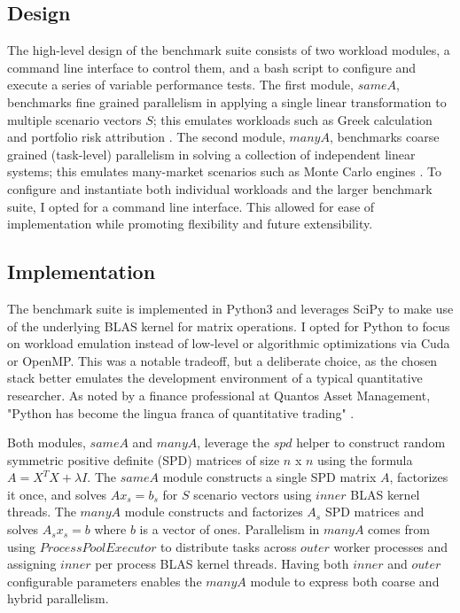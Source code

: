 \documentclass{article}
\begin{document}
\subsection{Design}
The high-level design of the benchmark suite consists of two workload modules, a command line interface to control them, and a bash script to configure and execute a series of variable performance tests. The first module, $sameA$, benchmarks fine grained parallelism in applying a single linear transformation to multiple scenario vectors $S$; this emulates workloads such as Greek calculation and portfolio risk attribution \cite{1}. The second module, $manyA$, benchmarks coarse grained (task-level) parallelism in solving a collection of independent linear systems; this emulates many-market scenarios such as Monte Carlo engines \cite{1}. To configure and instantiate both individual workloads and the larger benchmark suite, I opted for a command line interface. This allowed for ease of implementation while promoting flexibility and future extensibility. 


\subsection{Implementation}
The benchmark suite is implemented in Python3 and leverages SciPy to make use of the underlying BLAS kernel for matrix operations. I opted for Python to focus on workload emulation instead of low-level or algorithmic optimizations via Cuda or OpenMP. This was a notable tradeoff, but a deliberate choice, as the chosen stack better emulates the development environment of a typical quantitative researcher. As noted by a finance professional at Quantos Asset Management, "Python has become the lingua franca of quantitative trading" \cite{2}. 


Both modules, $sameA$ and $manyA$, leverage the $spd$ helper to construct random symmetric positive definite (SPD) matrices of size $n$ x $n$ using the formula  $ A = X^{T} X + \lambda I$. The $sameA$ module constructs a single SPD matrix $A$, factorizes it once, and solves $A x_s = b_s$ for $S$ scenario vectors using $inner$ BLAS kernel threads. The $manyA$ module constructs and factorizes $A_s$ SPD matrices and solves  $A_s x_s = b$ where $b$ is a vector of ones. Parallelism in $manyA$ comes from using $ProcessPoolExecutor$ to distribute tasks across $outer$ worker processes and assigning $inner$ per process BLAS kernel threads. Having both $inner$ and $outer$ configurable parameters enables the $manyA$ module to express both coarse and hybrid parallelism. 
\end{document}
